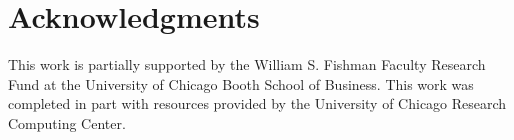 \documentclass[11pt]{article}
\numberwithin{equation}{section}
\numberwithin{theorem}{section}
\begin{document}
\title{}
\author{}
\date{First draft: ...}


\maketitle

\begin{abstract}

\end{abstract}



\newpage


\section*{Acknowledgments}


This work is partially supported by
the William S. Fishman Faculty Research Fund
at the University of Chicago Booth School of
Business. This work was completed in part with resources provided by
the University of Chicago Research Computing Center.



{


}


\appendix
\end{document}
